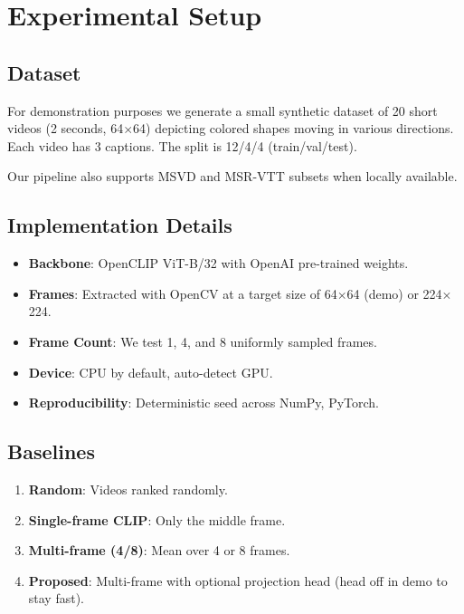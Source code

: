 \section{Experimental Setup}
\label{sec:experiments}

\subsection{Dataset}
For demonstration purposes we generate a small synthetic dataset of 20 short videos (2 seconds, 64$\times$64) depicting colored shapes moving in various directions. Each video has 3 captions. The split is 12/4/4 (train/val/test).

Our pipeline also supports MSVD \cite{chen2011msvd} and MSR-VTT subsets \cite{xu2016msrvtt} when locally available.

\subsection{Implementation Details}
\begin{itemize}
    \item \textbf{Backbone}: OpenCLIP ViT-B/32 with OpenAI pre-trained weights.
    \item \textbf{Frames}: Extracted with OpenCV at a target size of 64$\times$64 (demo) or 224$\times$224.
    \item \textbf{Frame Count}: We test 1, 4, and 8 uniformly sampled frames.
    \item \textbf{Device}: CPU by default, auto-detect GPU.
    \item \textbf{Reproducibility}: Deterministic seed across NumPy, PyTorch.
\end{itemize}

\subsection{Baselines}
\begin{enumerate}
    \item \textbf{Random}: Videos ranked randomly.
    \item \textbf{Single-frame CLIP}: Only the middle frame.
    \item \textbf{Multi-frame (4/8)}: Mean over 4 or 8 frames.
    \item \textbf{Proposed}: Multi-frame with optional projection head (head off in demo to stay fast).
\end{enumerate}
